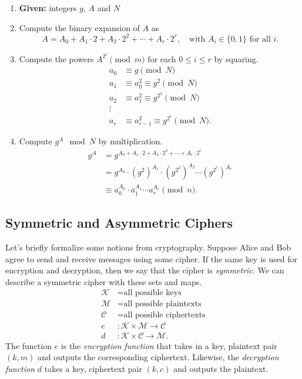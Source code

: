 \documentclass[12pt]{article}
\theoremstyle{plain}
\theoremstyle{definition}
\theoremstyle{remark}
\begin{document}
\begin{enumerate}
\item \textbf{Given: }integers $g$, $A$ and $N$
\item Compute the binary expansion of $A$ as 
\[
    A = A_0 + A_1\cdot 2 + A_2\cdot 2^2 + \cdots + A_r\cdot 2^r,\quad \text{with }A_i\in \{0,1\}\text{ for all }i.
\]
\item Compute the powers $A^{2^i}\pmod m$ for each $0\leq i \leq r$ by squaring.
    \begin{align*}
        a_0 &\equiv g\pmod N\\
        a_1 &\equiv a_0^2\equiv g^2\pmod N\\
        a_2 &\equiv a_1^2\equiv g^{2^2}\pmod N\\
        \vdots\\
        a_r &\equiv a_{r-1}^2\equiv g^{2^r}\pmod N.
    \end{align*}

\item Compute $g^A\mod N$ by multiplication.
    \begin{align*}
        g^A &= g^{A_0 + A_1\cdot 2 + A_2 \cdot 2^2 + \cdots + A_r\cdot 2^r}\\
        &= g^{A_0}\cdot (g^2)^{A_1}\cdot (g^{2^2})^{A_2}\cdots (g^{2^r})^{A_r}\\
        &\equiv a_0^{A_0}\cdot a_1^{A_1} \cdots a_r^{A_r}\pmod n.
    \end{align*}
\end{enumerate}










\addtocounter{subsection}{1}
\subsection{Symmetric and Asymmetric Ciphers}
Let's briefly formalize some notions from cryptography.
Suppose Alice and Bob agree to send and receive messages using some cipher.
If the same key is used for encryption and decryption, then we say that the cipher is \emph{symmetric}.
We can describe a symmetric cipher with these sets and maps.
\begin{align*}
    \mathcal{K} &= \text{all possible keys}\\
    \mathcal{M} &= \text{all possible plaintexts}\\
    \mathcal{C} &= \text{all possible ciphertexts}\\
    e &: \mathcal{K}\times \mathcal{M}\to \mathcal{C}\\
    d &: \mathcal{K}\times \mathcal{C}\to \mathcal{M}.
\end{align*}
The function $e$ is the \emph{encryption function} that takes in a key, plaintext pair $(k, m)$ and outputs the corresponding ciphertext.
Likewise, the \emph{decryption function} $d$ takes a key, ciphertext pair $(k, c)$ and outputs the plaintext.
\end{document}
